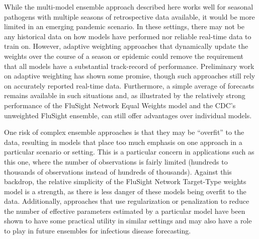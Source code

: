 \documentclass{article}\usepackage[]{graphicx}\usepackage[]{color}
\begin{document}


While the multi-model ensemble approach described here works well for seasonal pathogens with multiple seasons of retrospective data available, it would be more limited in an emerging pandemic scenario.
In these settings, there may not be any historical data on how models have performed nor reliable real-time data to train on.
However, adaptive weighting approaches that dynamically update the weights over the course of a season or epidemic could remove the requirement that all models have a substantial track-record of performance. 
Preliminary work on adaptive weighting has shown some promise, though such approaches still rely on accurately reported real-time data.
Furthermore, a simple average of forecasts remains available in such situations and, as illustrated by the relatively strong performance of the FluSight Network Equal Weights model and the CDC's unweighted FluSight ensemble, can still offer advantages over individual models.

One risk of complex ensemble approaches is that they may be ``overfit'' to the data, resulting in models that place too much emphasis on one approach in a particular scenario or setting.
This is a particular concern in applications such as this one, where the number of observations is fairly limited (hundreds to thousands of observations instead of hundreds of thousands).
Against this backdrop, the relative simplicity of the FluSight Network Target-Type weights model is a strength, as there is less danger of these models being overfit to the data.
Additionally, approaches that use regularization or penalization to reduce the number of effective parameters estimated by a particular model have been shown to have some practical utility in similar settings and may also have a role to play in future ensembles for infectious disease forecasting.\cite{Ray2018}
\end{document}
